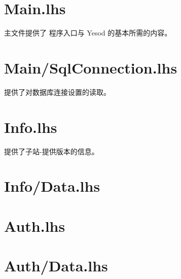 










  \maketitle
  \newpage
  \tableofcontents
  \newpage

  \section[程序主文件 Main.lhs文件]{Main.lhs}
  主文件提供了 程序入口与 Yesod 的基本所需的内容。
  

  \section[设置载入文件 Main/SqlConnection.lhs文件]{Main/SqlConnection.lhs}
  提供了对数据库连接设置的读取。
  

  \section[子站-提供版本信息 Info.lhs文件]{Info.lhs}
  提供了子站-提供版本的信息。
  

  \section[辅助Info.lhs文件]{Info/Data.lhs}
  
  
  \section[认证]{Auth.lhs}
  
  
  \section[辅助Auth.lhs]{Auth/Data.lhs}
  


  


